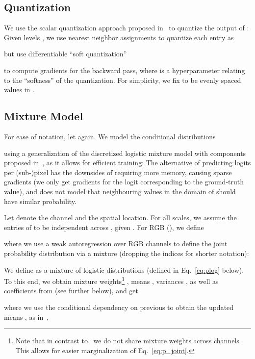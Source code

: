 \documentclass[10pt,twocolumn,letterpaper]{article}
\begin{document}
{\subsection{Quantization}\label{sec:quantization}


We use the scalar quantization approach proposed in~\cite{mentzer2018cvpr} to quantize the output of : Given levels , we use nearest neighbor assignments to quantize each entry  as

but use differentiable ``soft quantization''

to compute gradients for the backward pass, where  is a hyperparameter relating to the ``softness'' of the quantization. 
For simplicity, we fix  to be  evenly spaced values in . 


\subsection{Mixture Model} \label{sec:mixture_model}

For ease of notation, let  again. We model the conditional distributions

using a generalization of the discretized logistic mixture model with  components proposed in~\cite{Salimans2017pcnnpp}, as it allows for efficient training: 
The alternative of predicting logits per \mbox{(sub-)pixel} has the downsides of requiring more memory, causing sparse gradients (we only get gradients for the logit corresponding to the ground-truth value), and does not model that neighbouring values in the domain of  should have similar probability. 

Let  denote the channel and  the spatial location. For all scales, we assume the entries of  to be independent across , given . 
For RGB (), we define

    where we use a weak autoregression over RGB channels to define the joint probability distribution via a mixture  (dropping the indices  for shorter notation):

    We define  as a mixture of logistic distributions  (defined in Eq.~\eqref{eq:plog} below). To this end, we obtain mixture weights\footnote{Note that in contrast to~\cite{Salimans2017pcnnpp} we do not share mixture weights  across channels. This allows for easier marginalization of Eq.~\eqref{eq:p_joint}.}
    , means , variances , as well as coefficients  from  (see further below), and get

    where we use the conditional dependency on previous  to obtain the updated means , as in~\cite[Sec. 2.2]{Salimans2017pcnnpp},

}
\end{document}
